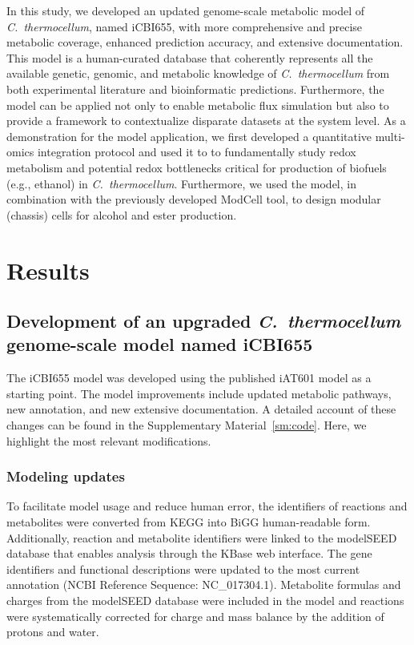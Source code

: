 In this study, we developed an updated genome-scale metabolic model of \textit{C.~thermocellum}, named iCBI655, with more comprehensive and precise metabolic coverage, enhanced prediction accuracy, and extensive documentation. This model is a human-curated database that coherently represents all the available genetic, genomic, and metabolic knowledge of \textit{C.~thermocellum} from both experimental literature and bioinformatic predictions. Furthermore, the model can be applied not only to enable metabolic flux simulation but also to provide a framework to contextualize disparate datasets at the system level. As a demonstration for the model application, we first developed a quantitative multi-omics integration protocol and used it to to fundamentally study redox metabolism and  potential  redox  bottlenecks  critical  for  production  of  biofuels  (e.g.,  ethanol)  in \textit{C.~thermocellum}. Furthermore, we used the model, in combination with the previously developed ModCell tool, \citep{garcia2019,garcia2020b} to design modular (chassis) cells\citep{garcia2019b} for alcohol and ester production.

\section{Results}
\subsection{Development of an upgraded \textit{C.~thermocellum} genome-scale model named iCBI655}
The iCBI655 model was developed using the published iAT601 model\citep{thompson2016} as a starting point. The model improvements include updated metabolic pathways, new annotation, and new extensive documentation.
A detailed account of these changes can be found in the Supplementary Material~\ref{sm:code}. Here, we highlight the most relevant modifications.

\subsubsection{Modeling updates}
To facilitate model usage and reduce human error, the identifiers of reactions and metabolites were converted from KEGG into BiGG human-readable form.\citep{king2015}
Additionally, reaction and metabolite identifiers were linked to the modelSEED database \citep{henry2010} that enables analysis through the KBase web interface. \citep{arkin2018}
The gene identifiers and functional descriptions were updated to the most current annotation (NCBI Reference Sequence: NC\_017304.1). %
Metabolite formulas and charges from the modelSEED database\citep{henry2010} were included in the model and reactions were systematically corrected for charge and mass balance by the addition of protons and water.


